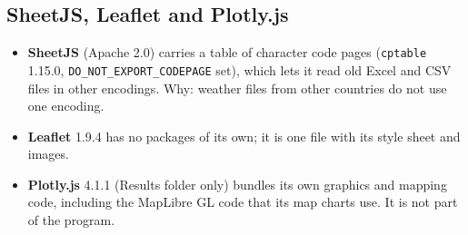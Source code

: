 \subsection{SheetJS, Leaflet and Plotly.js}
\begin{itemize}[nosep,leftmargin=1.2em]
\item \textbf{SheetJS} (Apache 2.0) carries a table of character code pages (\texttt{cptable} 1.15.0, \texttt{DO\_NOT\_EXPORT\_CODEPAGE} set), which lets it read old Excel and CSV files in other encodings. Why: weather files from other countries do not use one encoding.
\item \textbf{Leaflet} 1.9.4 has no packages of its own; it is one file with its style sheet and images.
\item \textbf{Plotly.js} 4.1.1 (Results folder only) bundles its own graphics and mapping code, including the MapLibre GL code that its map charts use. It is not part of the program.
\end{itemize}

